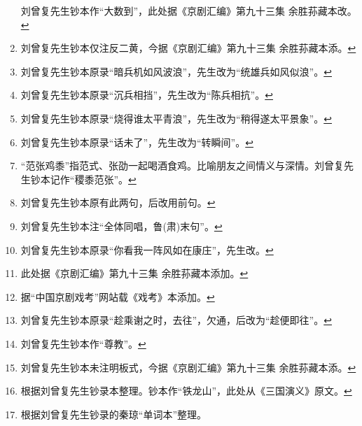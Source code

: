 \begin{enumerate}
  刘曾复先生钞本作``大数到''，此处据《京剧汇编》第九十三集
  余胜荪藏本改。\protect\hyperlink{fnref655}{↩}
\item
  \leavevmode\hypertarget{fn656}{}%
  刘曾复先生钞本仅注反二黄，今据《京剧汇编》第九十三集
  余胜荪藏本添。\protect\hyperlink{fnref656}{↩}
\item
  \leavevmode\hypertarget{fn657}{}%
  刘曾复先生钞本原录``暗兵机如风波浪''，先生改为``统雄兵如风似浪''。\protect\hyperlink{fnref657}{↩}
\item
  \leavevmode\hypertarget{fn658}{}%
  刘曾复先生钞本原录``沉兵相挡''，先生改为``陈兵相抗''。\protect\hyperlink{fnref658}{↩}
\item
  \leavevmode\hypertarget{fn659}{}%
  刘曾复先生钞本原录``烧得谁太平青浪''，先生改为``稍得遂太平景象''。\protect\hyperlink{fnref659}{↩}
\item
  \leavevmode\hypertarget{fn660}{}%
  刘曾复先生钞本原录``话未了''，先生改为``转瞬间''。\protect\hyperlink{fnref660}{↩}
\item
  \leavevmode\hypertarget{fn661}{}%
  ``范张鸡黍''指范式、张劭一起喝酒食鸡。比喻朋友之间情义与深情。刘曾复先生钞本记作``稷黍范张''。\protect\hyperlink{fnref661}{↩}
\item
  \leavevmode\hypertarget{fn662}{}%
  刘曾复先生钞本原有此两句，后改用前句。\protect\hyperlink{fnref662}{↩}
\item
  \leavevmode\hypertarget{fn663}{}%
  刘曾复先生钞本注``全体同唱，鲁(肃)末句''。\protect\hyperlink{fnref663}{↩}
\item
  \leavevmode\hypertarget{fn664}{}%
  刘曾复先生钞本原录``你看我一阵风如在康庄''，先生改。\protect\hyperlink{fnref664}{↩}
\item
  \leavevmode\hypertarget{fn665}{}%
  此处据《京剧汇编》第九十三集
  余胜荪藏本添加。\protect\hyperlink{fnref665}{↩}
\item
  \leavevmode\hypertarget{fn666}{}%
  据``中国京剧戏考''网站载《戏考》本添加。\protect\hyperlink{fnref666}{↩}
\item
  \leavevmode\hypertarget{fn667}{}%
  刘曾复先生钞本原录``趁乘谢之时，去往''，欠通，后改为``趁便即往''。\protect\hyperlink{fnref667}{↩}
\item
  \leavevmode\hypertarget{fn668}{}%
  刘曾复先生钞本作``尊教''。\protect\hyperlink{fnref668}{↩}
\item
  \leavevmode\hypertarget{fn669}{}%
  刘曾复先生钞本未注明板式，今据《京剧汇编》第九十三集
  余胜荪藏本添。\protect\hyperlink{fnref669}{↩}
\item
  \leavevmode\hypertarget{fn670}{}%
  根据刘曾复先生钞录本整理。钞本作``铁龙山''，此处从《三国演义》原文。\protect\hyperlink{fnref670}{↩}
\item
  \leavevmode\hypertarget{fn671}{}%
  根据刘曾复先生钞录的秦琼``单词本''整理。


\end{enumerate}

